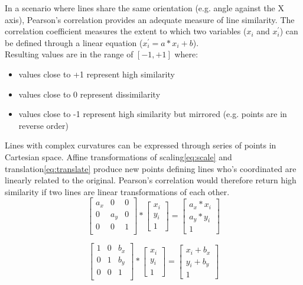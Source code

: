 \documentclass[
    floatsintext
]{article}
\begin{document}
In a scenario where lines share the same orientation (e.g. angle against the X axis), Pearson's correlation provides an adequate measure of line similarity.
The correlation coefficient measures the extent to which two variables ($x_i$ and $x_i^\prime$) 
can be defined through a linear equation ($x_i^\prime = a * x_i + b$). \\

Resulting values are in the range of $[-1,+1]$ where:
\begin{itemize}
    \item values close to +1 represent high similarity
    \item values close to 0 represent dissimilarity 
    \item values close to -1 represent high similarity but mirrored (e.g. points are in reverse order) 
\end{itemize}

Lines with complex curvatures can be expressed through series of points in Cartesian space. 
Affine transformations of scaling\eqref{eq:scale} and translation\eqref{eq:translate} produce new points defining lines who's coordinated are linearly related to the original. 
Pearson's correlation would therefore return high similarity if two lines are linear transformations of each other.    
\begin{equation}
  \begin{bmatrix}
    a_x & 0   & 0   \\
    0   & a_y & 0   \\
    0   & 0   &   1 \\ 
  \end{bmatrix} 
  *
  \begin{bmatrix}
    x_i \\ y_i \\ 1
  \end{bmatrix} 
  = 
  \begin{bmatrix}
    a_x * x_i \\ a_y * y_i \\ 1  
  \end{bmatrix}
  \label{eq:scale}
\end{equation}


\begin{equation}
  \begin{bmatrix}
    1 & 0 & b_x \\
    0 & 1 & b_y \\
    0 & 0 & 1   \\ 
  \end{bmatrix} 
  *
  \begin{bmatrix}
    x_i \\ y_i \\ 1
  \end{bmatrix} 
  = 
  \begin{bmatrix}
    x_i + b_x \\ y_i + b_y \\ 1  
  \end{bmatrix}
  \label{eq:translate}
\end{equation}
\end{document}
